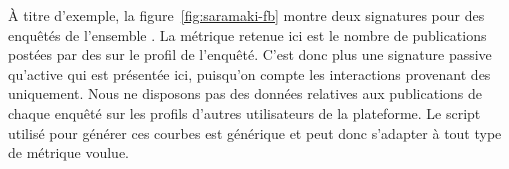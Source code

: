 À titre d’exemple, la figure~\ref{fig:saramaki-fb} montre deux signatures pour
des enquêtés de l’ensemble \nocsa. La métrique retenue ici est le nombre de
publications postées par des  sur le profil de l’enquêté. C’est donc
plus une signature passive qu’active qui est présentée ici, puisqu’on compte
les interactions provenant des  uniquement. Nous ne disposons pas des
données relatives aux publications de chaque enquêté sur les profils d’autres
utilisateurs de la plateforme. Le script utilisé pour générer ces courbes est
générique et peut donc s’adapter à tout type de métrique voulue.
